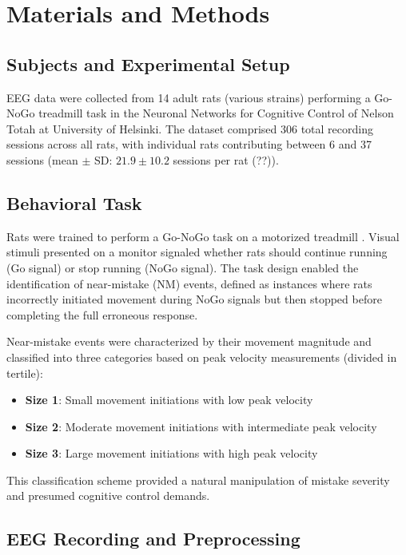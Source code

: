 \documentclass[11pt]{article}
\begin{document}
\section{Materials and Methods}

\subsection{Subjects and Experimental Setup}

EEG data were collected from 14 adult rats (various strains) performing a Go-NoGo treadmill task in the Neuronal Networks for Cognitive Control of Nelson Totah at University of Helsinki. The dataset comprised 306 total recording sessions across all rats, with individual rats contributing between 6 and 37 sessions (mean $\pm$ SD: $21.9 \pm 10.2$ sessions per rat (??)).

\subsection{Behavioral Task}

Rats were trained to perform a Go-NoGo task on a motorized treadmill \citep{doutel2024volitional}. Visual stimuli presented on a monitor signaled whether rats should continue running (Go signal) or stop running (NoGo signal). The task design enabled the identification of near-mistake (NM) events, defined as instances where rats incorrectly initiated movement during NoGo signals but then stopped before completing the full erroneous response.

Near-mistake events were characterized by their movement magnitude and classified into three categories based on peak velocity measurements (divided in tertile):
\begin{itemize}
\item \textbf{Size 1}: Small movement initiations with low peak velocity
\item \textbf{Size 2}: Moderate movement initiations with intermediate peak velocity
\item \textbf{Size 3}: Large movement initiations with high peak velocity
\end{itemize}

This classification scheme provided a natural manipulation of mistake severity and presumed cognitive control demands.

\subsection{EEG Recording and Preprocessing}
\end{document}
